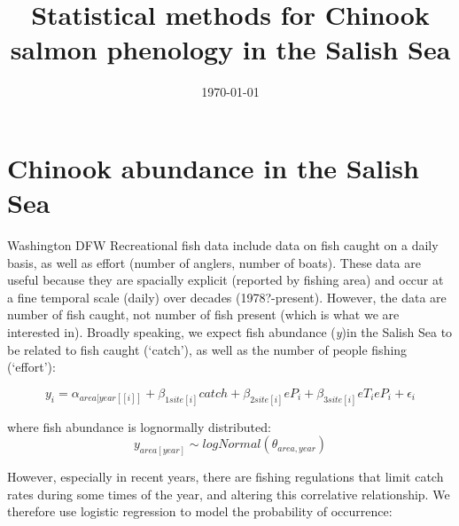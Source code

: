 \documentclass{article}
\begin{document}


\title{Statistical methods for Chinook salmon phenology in the Salish Sea}
\begin{singlespace}


\date{\today}
\maketitle %

\end{singlespace}


\clearpage

\section* {Chinook abundance in the Salish Sea}

\par Washington DFW Recreational fish data %
include data on fish caught on a daily basis, as well as effort (number of anglers, number of boats). These data are useful because they are spacially explicit (reported by fishing area) and occur at a fine temporal scale (daily) over decades (1978?-present). However, the data are number of fish caught, not number of fish present (which is what we are interested in). Broadly speaking, we expect fish abundance (\emph{y})in the Salish Sea to be related to fish caught (`catch'), as well as the number of people fishing (`effort'): 




\begin{equation}
y_{i}=\alpha_{area[year[[i]]}+ \beta_{1 site[i]}catch +\beta_{2 site[i]}eP_i+\beta_{3 site[i]}eT_ieP_i+\epsilon_{i}\label{eq:1}
\end{equation}

where fish abundance is lognormally distributed: 
\begin{equation}
y_{area[year]} \sim logNormal(\theta_{area,year})\label{eq:2}
\end{equation}

However, especially in recent years, there are fishing regulations that limit catch rates during some times of the year, and altering this correlative relationship. We therefore use logistic regression to model the probability of occurrence:
\end{document}
